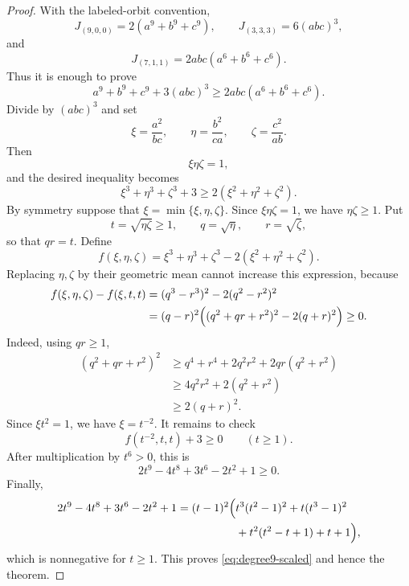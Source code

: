 \documentclass[11pt]{article}
\theoremstyle{definition}
\begin{document}
\begin{proof}
With the labeled-orbit convention,
\begin{equation*}
J_{(9,0,0)}=2(a^9+b^9+c^9),
\qquad
J_{(3,3,3)}=6(abc)^3,
\end{equation*}
and
\begin{equation*}
J_{(7,1,1)}=2abc(a^6+b^6+c^6).
\end{equation*}
Thus it is enough to prove
\begin{equation*}
a^9+b^9+c^9+3(abc)^3
\ge
2abc(a^6+b^6+c^6).
\end{equation*}
Divide by \((abc)^3\) and set
\begin{equation*}
\xi=\frac{a^2}{bc},
\qquad
\eta=\frac{b^2}{ca},
\qquad
\zeta=\frac{c^2}{ab}.
\end{equation*}
Then
\begin{equation*}
\xi\eta\zeta=1,
\end{equation*}
and the desired inequality becomes
\begin{equation}\label{eq:degree9-scaled}
\xi^3+\eta^3+\zeta^3+3
\ge
2(\xi^2+\eta^2+\zeta^2).
\end{equation}
By symmetry suppose that \(\xi=\min\{\xi,\eta,\zeta\}\).  Since \(\xi\eta\zeta=1\), we have \(\eta\zeta\ge1\).  Put
\begin{equation*}
t=\sqrt{\eta\zeta}\ge1,
\qquad
q=\sqrt\eta,
\qquad
r=\sqrt\zeta,
\end{equation*}
so that \(qr=t\).  Define
\begin{equation*}
f(\xi,\eta,\zeta)
=\xi^3+\eta^3+\zeta^3
-2(\xi^2+\eta^2+\zeta^2).
\end{equation*}
Replacing \(\eta,\zeta\) by their geometric mean cannot increase this expression, because
\begin{align*}
f(\xi,\eta,\zeta)-f(\xi,t,t)
&=(q^3-r^3)^2-2(q^2-r^2)^2\\
&=(q-r)^2\Bigl((q^2+qr+r^2)^2-2(q+r)^2\Bigr)\ge0.
\end{align*}
Indeed, using \(qr\ge1\),
\begin{align*}
(q^2+qr+r^2)^2
&\ge q^4+r^4+2q^2r^2+2qr(q^2+r^2)\\
&\ge4q^2r^2+2(q^2+r^2)\\
&\ge2(q+r)^2.
\end{align*}
Since \(\xi t^2=1\), we have \(\xi=t^{-2}\).  It remains to check
\begin{equation*}
f(t^{-2},t,t)+3\ge0
\qquad(t\ge1).
\end{equation*}
After multiplication by \(t^6>0\), this is
\begin{equation*}
2t^9-4t^8+3t^6-2t^2+1\ge0.
\end{equation*}
Finally,
\begin{align*}
2t^9-4t^8+3t^6-2t^2+1
=(t-1)^2\Bigl(&t^3(t^2-1)^2+t(t^3-1)^2\\
&+t^2(t^2-t+1)+t+1\Bigr),
\end{align*}
which is nonnegative for \(t\ge1\).  This proves \eqref{eq:degree9-scaled} and hence the theorem.
\end{proof}
\end{document}

